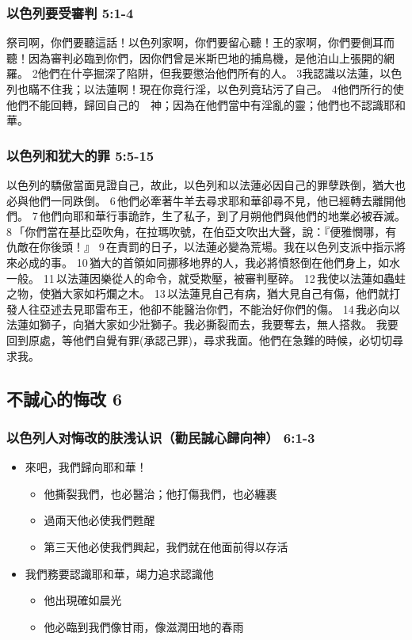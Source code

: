 \subsubsection{以色列要受審判 5:1-4}
祭司啊，你們要聽這話！以色列家啊，你們要留心聽！王的家啊，你們要側耳而聽！因為審判必臨到你們，因你們曾是米斯巴地的捕鳥機，是他泊山上張開的網羅。
2他們在什亭掘深了陷阱，但我要懲治他們所有的人。
3我認識以法蓮，以色列也瞞不住我；以法蓮啊！現在你竟行淫，以色列竟玷污了自己。
4他們所行的使他們不能回轉，歸回自己的　神；因為在他們當中有淫亂的靈；他們也不認識耶和華。

\subsubsection{以色列和犹大的罪 5:5-15}
以色列的驕傲當面見證自己，故此，以色列和以法蓮必因自己的罪孽跌倒，猶大也必與他們一同跌倒。 6 他們必牽著牛羊去尋求耶和華卻尋不見，他已經轉去離開他們。 7 他們向耶和華行事詭詐，生了私子，到了月朔他們與他們的地業必被吞滅。
8 「你們當在基比亞吹角，在拉瑪吹號，在伯亞文吹出大聲，說：『便雅憫哪，有仇敵在你後頭！』 9 在責罰的日子，以法蓮必變為荒場。我在以色列支派中指示將來必成的事。 10 猶大的首領如同挪移地界的人，我必將憤怒倒在他們身上，如水一般。 11 以法蓮因樂從人的命令，就受欺壓，被審判壓碎。 12 我使以法蓮如蟲蛀之物，使猶大家如朽爛之木。 13 以法蓮見自己有病，猶大見自己有傷，他們就打發人往亞述去見耶雷布王，他卻不能醫治你們，不能治好你們的傷。 14 我必向以法蓮如獅子，向猶大家如少壯獅子。我必撕裂而去，我要奪去，無人搭救。
我要回到原處，等他們自覺有罪(承認己罪)，尋求我面。他們在急難的時候，必切切尋求我。

\subsection{不誠心的悔改 6}
\subsubsection{以色列人对悔改的肤浅认识（勸民誠心歸向神） 6:1-3}
\begin{itemize}
\itemsep-.45em  
\item 來吧，我們歸向耶和華！
\begin{itemize}
\itemsep-.45em  
\item 他撕裂我們，也必醫治；他打傷我們，也必纏裹
\item 過兩天他必使我們甦醒
\item 第三天他必使我們興起，我們就在他面前得以存活
\end{itemize}
\item 我們務要認識耶和華，竭力追求認識他
\begin{itemize}
\itemsep-.45em  
\item 他出現確如晨光
\item 他必臨到我們像甘雨，像滋潤田地的春雨
\end{itemize}
\end{itemize}


